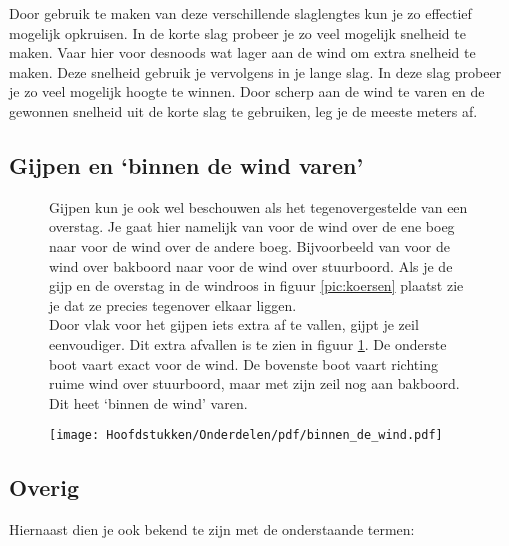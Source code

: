 \newpage

Door gebruik te maken van deze verschillende slaglengtes kun je zo effectief mogelijk opkruisen. In de korte slag probeer je zo veel mogelijk snelheid te maken. Vaar hier voor desnoods wat lager aan de wind om extra snelheid te maken. Deze snelheid gebruik je vervolgens in je lange slag. In deze slag probeer je zo veel mogelijk hoogte te winnen. Door scherp aan de wind te varen en de gewonnen snelheid uit de korte slag te gebruiken, leg je de meeste meters af.

\subsection{Gijpen en `binnen de wind varen'}
\begin{figure}[H]
	\centering
	\begin{minipage}[t]{0.78\textwidth}
		\vspace{-5cm}
		Gijpen kun je ook wel beschouwen als het tegenovergestelde van een overstag. Je gaat hier namelijk van voor de wind over de ene boeg naar voor de wind over de andere boeg. Bijvoorbeeld van voor de wind over bakboord naar voor de wind over stuurboord. Als je de gijp en de overstag in de windroos in figuur \ref{pic:koersen} plaatst zie je dat ze precies tegenover elkaar liggen.\\
		
		
		Door vlak voor het gijpen iets extra af te vallen, gijpt je zeil eenvoudiger. Dit extra afvallen is te zien in figuur \ref{pic:binnen_wind}. De onderste boot vaart exact voor de wind. De bovenste boot vaart richting ruime wind over stuurboord, maar met zijn zeil nog aan bakboord. Dit heet `binnen de wind' varen.
	\end{minipage}
	\hfill
	\begin{minipage}[b]{0.18\textwidth}
		\centering
		\texttt{[image: Hoofdstukken/Onderdelen/pdf/binnen\_de\_wind.pdf]}
		\caption{}
		\label{pic:binnen_wind}
	\end{minipage}
\end{figure}


\subsection{Overig}
Hiernaast dien je ook bekend te zijn met de onderstaande termen:

